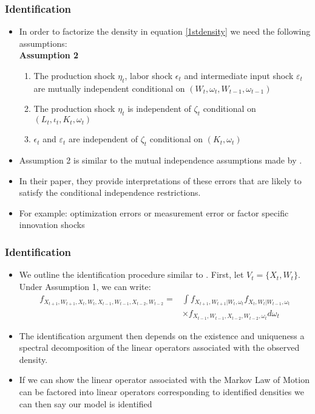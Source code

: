 \documentclass{beamer}
\begin{document}
\begin{frame}
\frametitle{Identification}
\begin{itemize}
\item In order to factorize the density in equation \eqref{1stdensity} we need the following assumptions:\\
\textbf{Assumption 2}
\begin{enumerate}
    \item The production shock $\eta_{t}$, labor shock $\epsilon_{t}$ and intermediate input shock $\varepsilon_{t}$ are mutually independent conditional on $(W_{t}, \omega_{t}, W_{t-1}, \omega_{t-1})$
    \item The production shock $\eta_{t}$ is independent of $\zeta_{t}$ conditional on $(L_{t}, \iota_{t}, K_{t}, \omega_{t})$
    \item $\epsilon_{t}$ and $\varepsilon_{t}$ are independent of $\zeta_{t}$ conditional on $(K_{t}, \omega_{t})$
\end{enumerate}
\item Assumption 2 is similar to the mutual independence assumptions made by \cite{Hu2019}. 
\item In their paper, they provide interpretations of these errors that are likely to satisfy the conditional independence restrictions.
\item For example: optimization errors or measurement error or factor specific innovation shocks
\end{itemize}
\end{frame}

\begin{frame}
\frametitle{Identification}
\begin{itemize}
\item We outline the identification procedure similar to \cite{Hu2012}. First, let $V_{t}=\{X_{t}, W_{t}\}$. Under Assumption 1, we can write:
 \begin{equation}\label{obsdens}
 \begin{split}
 f_{X_{t+1}, W_{t+1}, X_{t}, W_{t}, X_{t-1}, W_{t-1}, X_{t-2}, W_{t-2}}=&\int f_{X_{t+1},W_{t+1}|W_{t},\omega_{t}}f_{X_{t}, W_{t}|W_{t-1},\omega_{t}}\\
 &\times f_{X_{t-1}, W_{t-1}, X_{t-2}, W_{t-2}, \omega_{t}}d\omega_{t}
 \end{split}
 \end{equation}
 \item The identification argument then depends on the existence and uniqueness a spectral decomposition of the linear operators associated with the observed density. 
 \item If we can show the linear operator associated with the Markov Law of Motion can be factored into linear operators corresponding to identified densities we can then say our model is identified
\end{itemize}
\end{frame}
\end{document}
